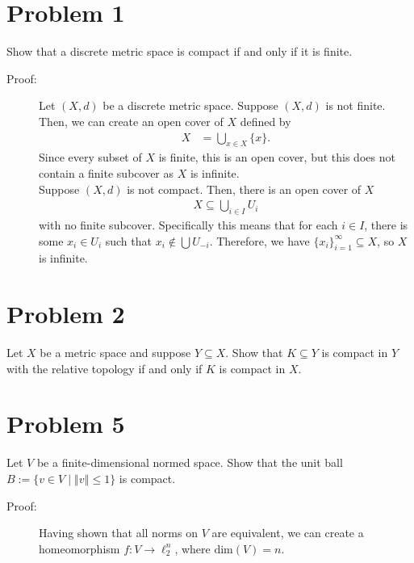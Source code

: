 \documentclass[10pt]{extarticle}
\title{}
\author{}
\date{}
\newcommand{\norm}[1]{\left\Vert #1\right\Vert}
\begin{document}
  \section{Problem 1}%
  Show that a discrete metric space is compact if and only if it is finite.
  \begin{description}
    \item[Proof:] Let $(X,d)$ be a discrete metric space. Suppose $(X,d)$ is not finite. Then, we can create an open cover of $X$ defined by
      \begin{align*}
        X &= \bigcup_{x\in X}\{x\}.
      \end{align*}
      Since every subset of $X$ is finite, this is an open cover, but this does not contain a finite subcover as $X$ is infinite.\\

      Suppose $(X,d)$ is not compact. Then, there is an open cover of $X$
      \begin{align*}
        X \subseteq \bigcup_{i\in I} U_i
      \end{align*}
      with no finite subcover. Specifically this means that for each $i\in I$, there is some $x_{i}\in U_i$ such that $x_{i}\notin \bigcup U_{-i}$. Therefore, we have $\{x_i\}_{i=1}^{\infty}\subseteq X$, so $X$ is infinite.
  \end{description}
  \section{Problem 2}%
  Let $X$ be a metric space and suppose $Y\subseteq X$. Show that $K\subseteq Y$ is compact in $Y$ with the relative topology if and only if $K$ is compact in $X$.
  \section{Problem 5}%
  Let $V$ be a finite-dimensional normed space. Show that the unit ball $B:= \{v\in V\mid \norm{v} \leq 1\}$ is compact.
  \begin{description}
    \item[Proof:] Having shown that all norms on $V$ are equivalent, we can create a homeomorphism $f: V\rightarrow \ell_{2}^{n}$, where $\text{dim}(V) = n$.
  \end{description}
\end{document}
